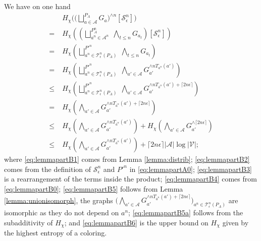\documentclass[conference,a4paper]{IEEEtran}
\begin{document}
We have on one hand
\begin{align}
    & H_\chi\Big(\big(\textstyle\bigsqcup^{P_A}_{a \in \mathcal{A}} G_a\big)^{\wedge n}[\mathcal{S}^n_\epsilon]\Big) \nonumber\\
    =  \; & H_\chi\left(\left(\textstyle\bigsqcup_{a^n \in \mathcal{A}^n}^{P_A^n} \; \textstyle\bigwedge_{t \leq n} G_{a_t}\right)[\mathcal{S}^n_\epsilon]\right) \label{eq:lemmapartB1} \\
    = \; & H_\chi\left(\textstyle\bigsqcup_{a^n \in \mathcal{T}^n_\epsilon(P_A)}^{P'^n} \;\textstyle\bigwedge_{t \leq n} G_{a_t}\right) \label{eq:lemmapartB2} \\
    = \; & H_\chi\left(\textstyle\bigsqcup_{a^n \in \mathcal{T}^n_\epsilon(P_A)}^{P'^n} \; \textstyle\bigwedge_{a' \in \mathcal{A}} G_{a'}^{\wedge n T_{a^n}(a')}\right) \label{eq:lemmapartB3} \\
    \leq \; & H_\chi\left(\textstyle\bigsqcup_{a^n \in \mathcal{T}^n_\epsilon(P_A)}^{P'^n} \; \textstyle\bigwedge_{a' \in \mathcal{A}} G_{a'}^{\wedge n T_{\overline{a}^n}(a') + \lceil 2 n\epsilon \rceil}\right) \label{eq:lemmapartB4} \\
    = \; & H_\chi\left(\textstyle\bigwedge_{a' \in \mathcal{A}} G_{a'}^{\wedge n T_{\overline{a}^n}(a') + \lceil 2 n\epsilon \rceil}\right) \label{eq:lemmapartB5} \\
    \leq \; & H_\chi\left(\textstyle\bigwedge_{a' \in \mathcal{A}} G_{a'}^{\wedge n T_{\overline{a}^n}(a')}\right) + H_\chi\left(\textstyle\bigwedge_{a' \in \mathcal{A}} G_{a'}^{\wedge \lceil 2 n\epsilon\rceil}\right) \label{eq:lemmapartB5a} \\
    \leq \; & H_\chi\left(\textstyle\bigwedge_{a' \in \mathcal{A}} G_{a'}^{\wedge n T_{\overline{a}^n}(a')}\right) + \lceil 2 n\epsilon \rceil|\mathcal{A}|\log|\mathcal{V}|;\label{eq:lemmapartB6}
\end{align}
where \eqref{eq:lemmapartB1} comes from Lemma \ref{lemma:distrib}; \eqref{eq:lemmapartB2} comes from the definition of $\mathcal{S}_\epsilon^n$ and $P'^n$ in \eqref{eq:lemmapartA0}; \eqref{eq:lemmapartB3} is a rearrangement of the terms inside the product; \eqref{eq:lemmapartB4} comes from \eqref{eq:lemmapartB0}; \eqref{eq:lemmapartB5} follows from Lemma \ref{lemma:unionisomorph}, the graphs $\big(\bigwedge_{a' \in \mathcal{A}} G_{a'}^{\wedge n T_{\overline{a}^n}(a') + \lceil 2 n\epsilon \rceil}\big)_{a^n \in \mathcal{T}^n_\epsilon(P_A)}$ are isomorphic as they do not depend on $a^n$; \eqref{eq:lemmapartB5a} follows from the subadditivity of $H_\chi$; and \eqref{eq:lemmapartB6} is the upper bound on $H_\chi$ given by the highest entropy of a coloring.
\end{document}
